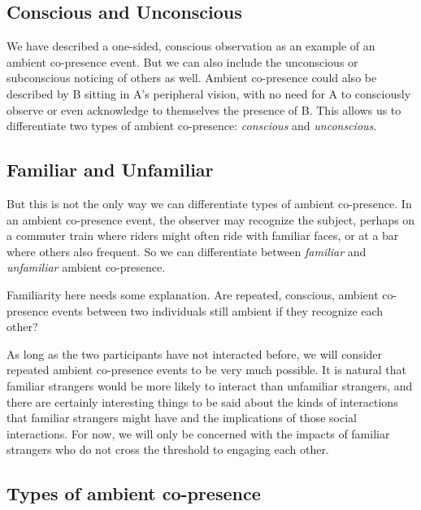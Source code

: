 \documentclass[12pt]{article}
\begin{document}
\subsection{Conscious and Unconscious}

We have described a one-sided, conscious observation as an example of an ambient co-presence event. But we can also include the unconscious or subconscious noticing of others as well. Ambient co-presence could also be described by B sitting in A's peripheral vision, with no need for A to consciously observe or even acknowledge to themselves the presence of B. This allows us to differentiate two types of ambient co-presence: \textit{conscious} and \textit{unconscious}.

\subsection{Familiar and Unfamiliar}

But this is not the only way we can differentiate types of ambient co-presence. In an ambient co-presence event, the observer may recognize the subject, perhaps on a commuter train where riders might often ride with familiar faces, or at a bar where others also frequent. So we can differentiate between \textit{familiar} and \textit{unfamiliar} ambient co-presence.

Familiarity here needs some explanation. Are repeated, conscious, ambient co-presence events between two individuals still ambient if they recognize each other?

As long as the two participants have not interacted before, we will consider repeated ambient co-presence events to be very much possible. It is natural that familiar strangers would be more likely to interact than unfamiliar strangers, and there are certainly interesting things to be said about the kinds of interactions that familiar strangers might have and the implications of those social interactions. For now, we will only be concerned with the impacts of familiar strangers who do not cross the threshold to engaging each other.

\subsection{Types of ambient co-presence}

\end{document}
